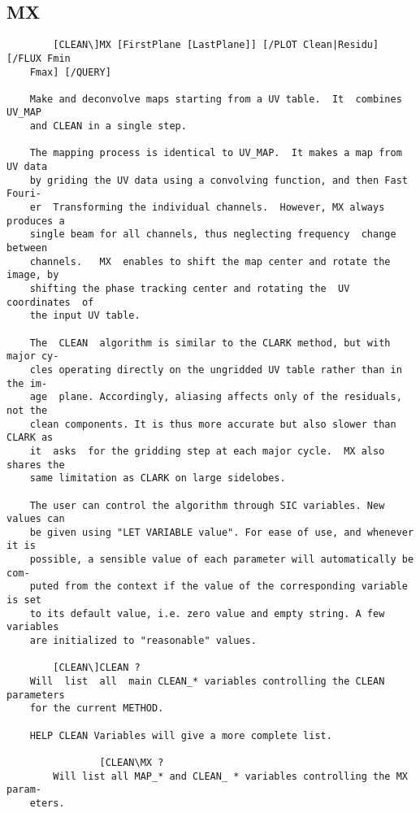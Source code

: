 \subsection{MX}
\begin{verbatim}
        [CLEAN\]MX [FirstPlane [LastPlane]] [/PLOT Clean|Residu] [/FLUX Fmin
    Fmax] [/QUERY]

    Make and deconvolve maps starting from a UV table.  It  combines  UV_MAP
    and CLEAN in a single step.

    The mapping process is identical to UV_MAP.  It makes a map from UV data
    by griding the UV data using a convolving function, and then Fast Fouri-
    er  Transforming the individual channels.  However, MX always produces a
    single beam for all channels, thus neglecting frequency  change  between
    channels.   MX  enables to shift the map center and rotate the image, by
    shifting the phase tracking center and rotating the  UV  coordinates  of
    the input UV table.

    The  CLEAN  algorithm is similar to the CLARK method, but with major cy-
    cles operating directly on the ungridded UV table rather than in the im-
    age  plane. Accordingly, aliasing affects only of the residuals, not the
    clean components. It is thus more accurate but also slower than CLARK as
    it  asks  for the gridding step at each major cycle.  MX also shares the
    same limitation as CLARK on large sidelobes.

    The user can control the algorithm through SIC variables. New values can
    be given using "LET VARIABLE value". For ease of use, and whenever it is
    possible, a sensible value of each parameter will automatically be  com-
    puted from the context if the value of the corresponding variable is set
    to its default value, i.e. zero value and empty string. A few  variables
    are initialized to "reasonable" values.

        [CLEAN\]CLEAN ?
    Will  list  all  main CLEAN_* variables controlling the CLEAN parameters
    for the current METHOD.

    HELP CLEAN Variables will give a more complete list.

                [CLEAN\MX ?
        Will list all MAP_* and CLEAN_ * variables controlling the MX param-
    eters.

\end{verbatim}
